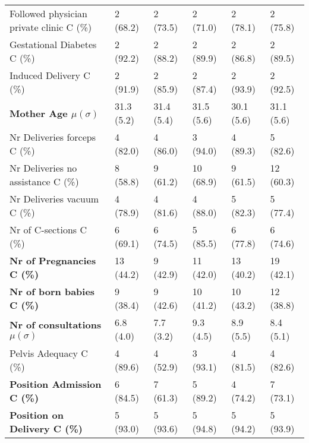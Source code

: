 \begin{tabular}{llllll}
   \begin{minipage}{3.9cm}\setstretch{0.65}Followed physician private clinic C (\%)\vspace{1mm}\end{minipage} & 2 (68.2) & 2 (73.5) & 2 (71.0) & 2 (78.1) & 2 (75.8) \\
   Gestational Diabetes C (\%)  & 2 (92.2) & 2 (88.2) & 2 (89.9) & 2 (86.8) & 2 (89.5) \\
   Induced Delivery C (\%) & 2 (91.9) & 2 (85.9) & 2 (87.4) & 2 (93.9) & 2 (92.5) \\
   \textbf{Mother Age $\mu (\sigma)$ }  & 31.3 (5.2) & 31.4 (5.4) & 31.5 (5.6) & 30.1 (5.6) & 31.1 (5.6) \\
   
   \begin{minipage}{3.9cm}\setstretch{0.65}Nr Deliveries forceps C (\%)\vspace{1mm}\end{minipage} & 4 (82.0) & 4 (86.0) & 3 (94.0) & 4 (89.3) & 5 (82.6) \\
   \begin{minipage}{3.9cm}\setstretch{0.65}Nr Deliveries no assistance C (\%)\vspace{1mm}\end{minipage}  & 8 (58.8) & 9 (61.2) & 10 (68.9) & 9 (61.5) & 12 (60.3) \\
   \begin{minipage}{3.9cm}\setstretch{0.65}Nr Deliveries vacuum C (\%)\vspace{1mm}\end{minipage}& 4 (78.9) & 4 (81.6) & 4 (88.0) & 5 (82.3) & 5 (77.4) \\
   Nr of C-sections C (\%) & 6 (69.1) & 6 (74.5) & 5 (85.5) & 6 (77.8) & 6 (74.6) \\
   \textbf{Nr of Pregnancies C (\%)} & 13 (44.2) & 9 (42.9) & 11 (42.0) & 13 (40.2) & 19 (42.1) \\
   \textbf{Nr of born babies C (\%)} & 9 (38.4) & 9 (42.6) & 10 (41.2) & 10 (43.2) & 12 (38.8) \\
   \textbf{Nr of consultations $\mu (\sigma)$ } & 6.8 (4.0) & 7.7 (3.2) & 9.3 (4.5) & 8.9 (5.5) & 8.4 (5.1) \\
   Pelvis Adequacy  C (\%)  & 4 (89.6) & 4 (52.9) & 3 (93.1) & 4 (81.5) & 4 (82.6) \\
   \textbf{Position Admission C (\%)} & 6 (84.5) & 7 (61.3) & 5 (89.2) & 4 (74.2) & 7 (73.1) \\
   \textbf{Position on Delivery C (\%)} & 5 (93.0) & 5 (93.6) & 5 (94.8) & 5 (94.2) & 5 (93.9) \\
   

\end{tabular}
